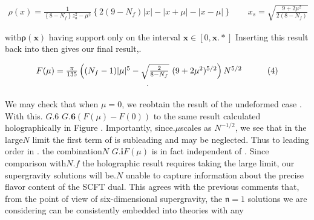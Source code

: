 \documentclass{article}
\begin{document}
\begin{equation}
\begin{array} { r } { \rho ( x ) = \frac { 1 } { \left \{ 8 - N _ { f } \right \} z _ { a } ^ { 2 } - \mu ^ { 2 } } \left \{ 2 ( 9 - N _ { f } ) | x | - | x + \mu | - | x - \mu | \right \} \qquad x _ { s } = \sqrt { \frac { 9 + 2 \mu ^ { 2 } } { 2 ( 8 - N _ { f } ) } } \qquad }\end{array}
\end{equation}


with$\pmb { \rho } ( \pmb { x } )$ having support only on the interval $\pmb { x } \in [ 0, \pmb { x } . { * } ]$ Inserting this result back into then
gives our final result,.


\begin{equation}
\begin{array} { c c } { F ( \mu ) = \frac { \pi } { 1 3 5 } \left ( ( N _ { f } - 1 ) | \mu | ^ { 5 } - \sqrt { \frac { 2 } { 8 - N _ { f } } } ~ ( 9 + 2 \mu ^ { 2 } ) ^ { 5 / 2 } \right ) N ^ { 5 / 2 } \qquad } & { ( 4 ) } \\ {. } \end{array}
\end{equation}


We may check that when $\mu = 0$, we reobtain the result of the undeformed case . With this.
$G . { 6 }$ $G . { \mathbf { 6 } } ( F ( \mu ) - F ( 0 ) )$ to the same result
calculated holographically in Figure . Importantly, since.$\mu$scales as $N ^ { - 1 / 2 }$, we see that in
the large$N$ limit the first term of is subleading and may be neglected. Thus to leading
order in  . the combination$N$ $G . { \mathbf { i } } F ( \mu )$ is in fact independent of  . Since comparison with$N . { f }$
the holographic result requires taking the large  limit, our supergravity solutions will be.$N$
unable to capture information about the precise flavor content of the SCFT dual. This agrees
with the previous comments that, from the point of view of six-dimensional supergravity,
the $\mathfrak { n } = 1$ solutions we are considering can be consistently embedded into theories with any
\end{document}
